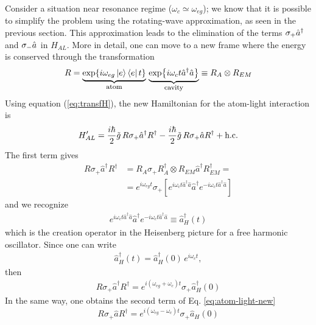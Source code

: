 Consider a situation near resonance regime ($\omega_c \simeq \omega_{eg}$); we know that it is possible to simplify the problem using the rotating-wave approximation, as seen in the previous section. This approximation leads to the elimination of the terms $\sigma_{+} \hat{a}^{\dagger}_{}$ and $\sigma_{-} \hat{a}_{}$ in $H_{AL}$. More in detail, one can move to a new frame where the energy is conserved through the transformation
\begin{equation}
    R = \underbrace{\exp{{i \omega_{eg} \ket{e}\bra{e} t}}}_{\text{\footnotesize atom}} \, \underbrace{\exp{i \omega_c t \hat{a}^{\dagger} \hat{a}}}_{\text{\footnotesize cavity}} \equiv  R_A \otimes R_{EM}
\end{equation}
Using equation (\ref{eq:transfH}), the new Hamiltonian for the atom-light interaction is 
\begin{align}
    H'_{AL} = \frac{i \hbar}{2} \Tilde{g} \, R \sigma_{+} \hat{a}^{\dagger} R^{\dagger} - \frac{i \hbar}{2} \Tilde{g} \, R \sigma_{+} \hat{a} R^{\dagger} + \text{h.c.}
    \label{eq:atom-light-new}
\end{align}
The first term gives
\begin{align*}
    R \sigma_{+} \hat{a}^{\dagger} R^{\dagger} &= {R_A \sigma_{+} R_A^{\dagger}} \otimes  R_{EM} \hat{a}^{\dagger} R_{EM}^{\dagger} = \\
    &= e^{i \omega_{eg} t } \sigma_{+} \left[  e^{i \omega_c t \hat{a}^{\dagger} \hat{a}} \hat{a}^{\dagger} e^{-i \omega_c t \hat{a}^{\dagger} \hat{a}} \right] 
\end{align*}
and we recognize
\begin{align*}
     e^{i \omega_c t \hat{a}^{\dagger} \hat{a}} \hat{a}^{\dagger} e^{-i \omega_c t \hat{a}^{\dagger} \hat{a}} \equiv  \hat{a}_H^{\dagger}(t)
\end{align*} 
which is the creation operator in the Heisenberg picture for a free harmonic oscillator. Since one can write 
\begin{align*}
    \hat{a}_H^{\dagger}(t) = \hat{a}_H^{\dagger}(0) \, e^{i \omega_c t}, 
\end{align*}
then
\begin{align}
    R \sigma_{+} \hat{a}^{\dagger} R^{\dagger} = e^{i (\omega_{eg} + \omega_c) t} \sigma_{+} \hat{a}_H^{\dagger}(0)
\end{align}
In the same way, one obtains the second term of Eq. \ref{eq:atom-light-new}
\begin{equation}
    R \sigma_{+} \hat{a} R^{\dagger} = e^{i (\omega_{eg} - \omega_c  ) t} \sigma_{+} \hat{a}_H(0)
\end{equation}
